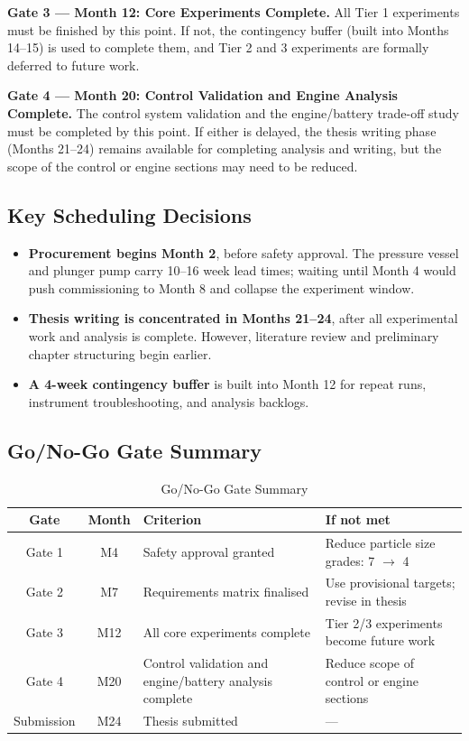 \documentclass[12pt]{article}
\begin{document}
\medskip
\noindent\textbf{Gate 3 --- Month 12: Core Experiments Complete.} All Tier 1 experiments must
be finished by this point. If not, the contingency buffer (built into Months 14--15)
is used to complete them, and Tier 2 and 3 experiments are formally deferred to
future work.

\medskip
\noindent\textbf{Gate 4 --- Month 20: Control Validation and Engine Analysis Complete.} The
control system validation and the engine/battery trade-off study must be completed
by this point. If either is delayed, the thesis writing phase (Months 21--24)
remains available for completing analysis and writing, but the scope of the control
or engine sections may need to be reduced.

\subsection*{Key Scheduling Decisions}

\begin{itemize}
    \item \textbf{Procurement begins Month 2}, before safety approval. The pressure vessel and
          plunger pump carry 10--16 week lead times; waiting until Month 4 would push
          commissioning to Month 8 and collapse the experiment window.
    \item \textbf{Thesis writing is concentrated in Months 21--24}, after all experimental work
          and analysis is complete. However, literature review and preliminary
          chapter structuring begin earlier.
    \item \textbf{A 4-week contingency buffer} is built into Month 12 for repeat runs,
          instrument troubleshooting, and analysis backlogs.
\end{itemize}

\break

\subsection*{Go/No-Go Gate Summary}

\begin{table}[!ht]
\centering
\small
\setlength{\tabcolsep}{4pt}
\begin{tabular}{|c|c|p{3.8cm}|p{4.5cm}|}
\hline
\textbf{Gate} & \textbf{Month} & \textbf{Criterion} & \textbf{If not met} \\
\hline
Gate 1 & M4  & Safety approval granted & Reduce particle size grades: 7 $\rightarrow$ 4 \\
\hline
Gate 2 & M7  & Requirements matrix finalised & Use provisional targets; revise in thesis \\
\hline
Gate 3 & M12 & All core experiments complete & Tier 2/3 experiments become future work \\
\hline
Gate 4 & M20 & Control validation and engine/battery analysis complete & Reduce scope of control or engine sections \\
\hline
Submission & M24 & Thesis submitted & --- \\
\hline
\end{tabular}
\caption*{Go/No-Go Gate Summary}
\label{tab:gates}
\end{table}
\end{document}
